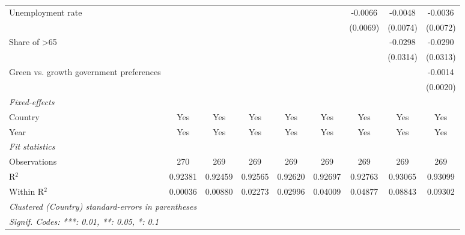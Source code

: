 \begin{table}[htbp]
\begin{tabular}{lcccccccc}
      Unemployment rate                                                       &          &          &          &          &          & -0.0066  & -0.0048       & -0.0036\\   
                                                                              &          &          &          &          &          & (0.0069) & (0.0074)      & (0.0072)\\   
      Share of >65                                                            &          &          &          &          &          &          & -0.0298       & -0.0290\\   
                                                                              &          &          &          &          &          &          & (0.0314)      & (0.0313)\\   
      Green vs. growth government preferences                                 &          &          &          &          &          &          &               & -0.0014\\   
                                                                              &          &          &          &          &          &          &               & (0.0020)\\   
      \midrule
      \emph{Fixed-effects}\\
      Country                                                                 & Yes      & Yes      & Yes      & Yes      & Yes      & Yes      & Yes           & Yes\\  
      Year                                                                    & Yes      & Yes      & Yes      & Yes      & Yes      & Yes      & Yes           & Yes\\  
      \midrule
      \emph{Fit statistics}\\
      Observations                                                            & 270      & 269      & 269      & 269      & 269      & 269      & 269           & 269\\  
      R$^2$                                                                   & 0.92381  & 0.92459  & 0.92565  & 0.92620  & 0.92697  & 0.92763  & 0.93065       & 0.93099\\  
      Within R$^2$                                                            & 0.00036  & 0.00880  & 0.02273  & 0.02996  & 0.04009  & 0.04877  & 0.08843       & 0.09302\\  
      \midrule \midrule
      \multicolumn{9}{l}{\emph{Clustered (Country) standard-errors in parentheses}}\\
      \multicolumn{9}{l}{\emph{Signif. Codes: ***: 0.01, **: 0.05, *: 0.1}}\\
   \end{tabular}
\end{table}


